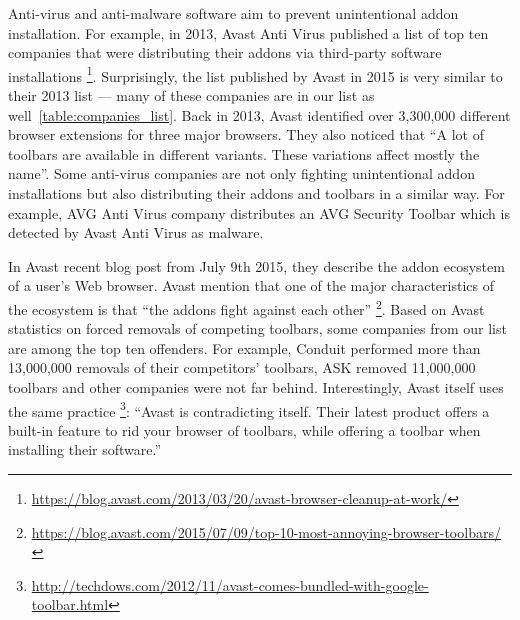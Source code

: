 \documentclass[11pt,oneside]{book}
\begin{document}
Anti-virus and anti-malware software aim to prevent unintentional addon installation. For example, in 2013, Avast Anti Virus published a list of top ten companies that were distributing their addons via third-party software installations \footnote{\url{https://blog.avast.com/2013/03/20/avast-browser-cleanup-at-work/}}. Surprisingly, the list published by Avast in 2015 is very similar to their 2013 list --- many of these companies are in our list as well~\autoref{table:companies_list}. Back in 2013, Avast identified over 3,300,000 different browser extensions for three major browsers. They also noticed that ``A lot of toolbars are available in different variants. These variations affect mostly the name''. Some anti-virus companies are not only fighting unintentional addon installations but also distributing their addons and toolbars in a similar way. For example, AVG Anti Virus company distributes an AVG Security Toolbar which is detected by Avast Anti Virus as malware. 

In Avast recent blog post from July 9th 2015, they describe the addon ecosystem of a user's Web browser. Avast mention that one of the major characteristics of the ecosystem is that ``the addons fight against each other'' \footnote{\url{https://blog.avast.com/2015/07/09/top-10-most-annoying-browser-toolbars/}}.
Based on Avast statistics on forced removals of competing toolbars, some companies from our list are among the top ten offenders. For example, Conduit performed more than 13,000,000 removals of their competitors' toolbars, ASK removed 11,000,000 toolbars and other companies were not far behind. Interestingly, Avast itself uses the same practice \footnote{\url{http://techdows.com/2012/11/avast-comes-bundled-with-google-toolbar.html}}: ``Avast is contradicting itself. Their latest product offers a built-in feature to rid your browser of toolbars, while offering a toolbar when installing their software.''
\end{document}
